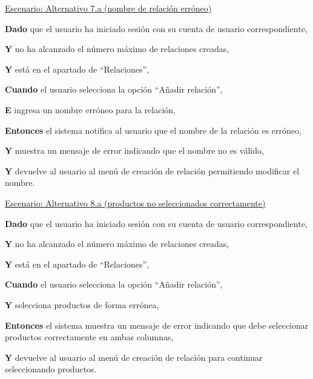 \underline{Escenario: Alternativo 7.a (nombre de relación erróneo)}\par
\vspace{0.15cm}
\textbf{Dado} que el usuario ha iniciado sesión con su cuenta de usuario correspondiente,\par
\textbf{Y} no ha alcanzado el número máximo de relaciones creadas,\par
\textbf{Y} está en el apartado de \enquote{Relaciones},\par
\textbf{Cuando} el usuario selecciona la opción \enquote{Añadir relación},\par
\textbf{E} ingresa un nombre erróneo para la relación,\par
\textbf{Entonces} el sistema notifica al usuario que el nombre de la relación es erróneo,\par
\textbf{Y} muestra un mensaje de error indicando que el nombre no es válido,\par
\textbf{Y} devuelve al usuario al menú de creación de relación permitiendo modificar el nombre.\par

\vspace{0.20cm}

\underline{Escenario: Alternativo 8.a (productos no seleccionados correctamente)}\par
\vspace{0.15cm}
\textbf{Dado} que el usuario ha iniciado sesión con su cuenta de usuario correspondiente,\par
\textbf{Y} no ha alcanzado el número máximo de relaciones creadas,\par
\textbf{Y} está en el apartado de \enquote{Relaciones},\par
\textbf{Cuando} el usuario selecciona la opción \enquote{Añadir relación},\par
\textbf{Y} selecciona productos de forma errónea,\par
\textbf{Entonces} el sistema muestra un mensaje de error indicando que debe seleccionar productos correctamente en ambas columnas,\par
\textbf{Y} devuelve al usuario al menú de creación de relación para continuar seleccionando productos.\par

\vspace{0.20cm}

